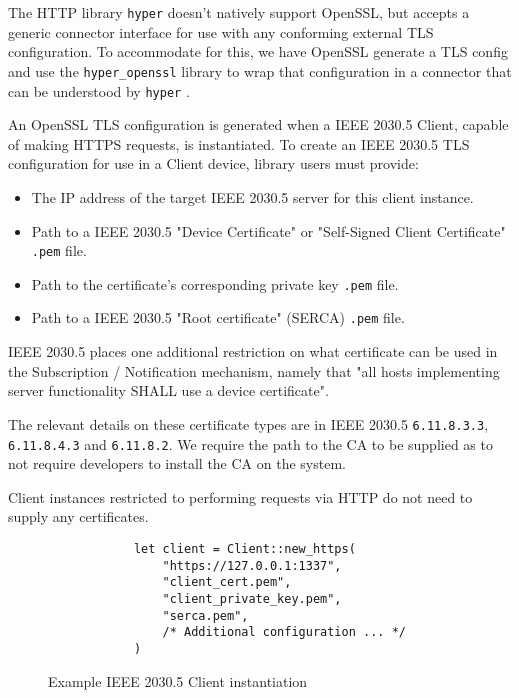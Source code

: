 The HTTP library \texttt{hyper} doesn't natively support OpenSSL, but accepts a generic connector interface for use with any conforming external TLS configuration. To accommodate for this, we have OpenSSL generate a TLS config and use the \texttt{hyper\_openssl} library to wrap that configuration in a connector that can be understood by \texttt{hyper} \cite{hyperopenssl}. 

An OpenSSL TLS configuration is generated when a IEEE 2030.5 Client, capable of making HTTPS requests, is instantiated. To create an IEEE 2030.5 TLS configuration for use in a Client device, library users must provide:

\begin{itemize}
    \item The IP address of the target IEEE 2030.5 server for this client instance.
    \item Path to a IEEE 2030.5 "Device Certificate" or "Self-Signed Client Certificate" \texttt{.pem} file.
    \item Path to the certificate's corresponding private key \texttt{.pem} file.
    \item Path to a IEEE 2030.5 "Root certificate" (SERCA) \texttt{.pem} file. 
\end{itemize}

IEEE 2030.5 places one additional restriction on what certificate can be used in the Subscription / Notification mechanism, namely that "all hosts implementing server functionality SHALL use a device certificate".

The relevant details on these certificate types are in IEEE 2030.5 \texttt{6.11.8.3.3}, \texttt{6.11.8.4.3} and \texttt{6.11.8.2}. We require the path to the CA to be supplied as to not require developers to install the CA on the system.

Client instances restricted to performing requests via HTTP do not need to supply any certificates.

\begin{figure}[h]
    \begin{center}
        \begin{lstlisting}
            let client = Client::new_https(
                "https://127.0.0.1:1337",
                "client_cert.pem",
                "client_private_key.pem",
                "serca.pem",
                /* Additional configuration ... */
            )
        \end{lstlisting}
        \label{fig:httpsclientexample}
        \vspace{-10pt}
        \caption{Example IEEE 2030.5 Client instantiation}
    \end{center}
\end{figure}

